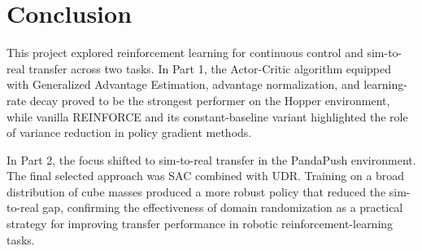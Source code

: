 \section{Conclusion}

This project explored reinforcement learning for continuous control and 
sim-to-real transfer across two tasks. In Part 1, the Actor-Critic algorithm 
equipped with Generalized Advantage Estimation, advantage normalization, 
and learning-rate decay proved to be the strongest performer on the Hopper 
environment, while vanilla REINFORCE and its constant-baseline variant
highlighted the role of variance reduction in policy gradient methods.

In Part 2, the focus shifted to sim-to-real transfer in the PandaPush environment.
The final selected approach was SAC combined with UDR. Training on a broad distribution of cube masses produced
a more robust policy that reduced the sim-to-real gap, confirming the effectiveness of domain randomization as a
practical strategy for improving transfer performance in robotic reinforcement-learning tasks.